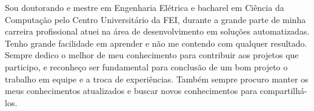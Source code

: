 

\begin{cvparagraph}

Sou doutorando e mestre em Engenharia Elétrica e bacharel em Ciência da Computação pelo Centro Universitário da FEI, durante a grande parte de minha carreira profissional atuei na área de desenvolvimento em soluções automatizadas. Tenho grande facilidade em aprender e não me contendo com qualquer resultado. Sempre dedico o melhor de meu conhecimento para contribuir aos projetos que participo, e reconheço ser fundamental para conclusão de um bom projeto o trabalho em equipe e a troca de experiências. Também sempre procuro manter os meus conhecimentos atualizados e buscar novos conhecimentos para compartilhá-los.
\end{cvparagraph}
